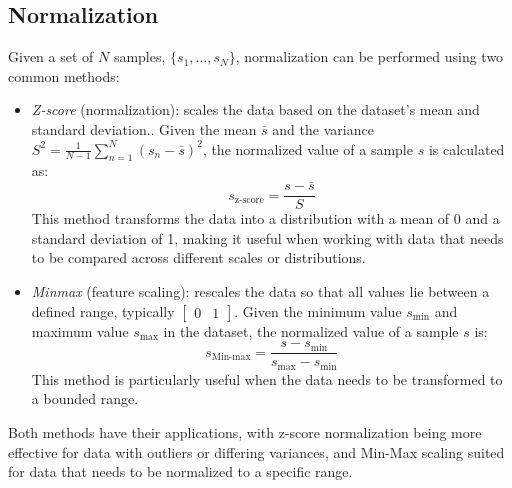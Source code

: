 \subsection{Normalization}
Given a set of $N$ samples, $\{s_1,\dots,s_N\}$, normalization can be performed using two common methods:
\begin{itemize}
    \item \textit{Z-score} (normalization): scales the data based on the dataset's mean and standard deviation.. 
        Given the mean $\bar{s}$ and the variance $S^2=\frac{1}{N-1}\sum_{n=1}^N(s_n-\bar{s})^2$, the normalized value of a sample $s$ is calculated as:
        \[s_{\text{z-score}}=\dfrac{s-\bar{s}}{S}\]
        This method transforms the data into a distribution with a mean of 0 and a standard deviation of 1, making it useful when working with data that needs to be compared across different scales or distributions.
    \item \textit{Minmax} (feature scaling): rescales the data so that all values lie between a defined range, typically $\begin{bmatrix} 0 & 1 \end{bmatrix}$.
        Given the minimum value $s_{\min}$ and maximum value $s_{\max}$ in the dataset, the normalized value of a sample $s$ is: 
        \[s_{\text{Min-max}}=\dfrac{s-s_{\min}}{s_{\max}-s_{\min}}\]
        This method is particularly useful when the data needs to be transformed to a bounded range.
\end{itemize}
Both methods have their applications, with z-score normalization being more effective for data with outliers or differing variances, and Min-Max scaling suited for data that needs to be normalized to a specific range.

